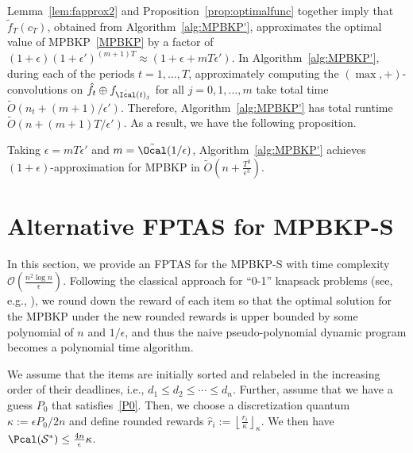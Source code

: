 Lemma~\ref{lem:fapprox2} and Proposition~\ref{prop:optimalfunc} together imply that $\tilde{f}_T(c_T)$, obtained from Algorithm~\ref{alg:MPBKP'}, approximates the optimal value of MPBKP~\eqref{MPBKP} by a factor of $(1+\epsilon)(1+\epsilon')^{(m+1)T} \approx (1+\epsilon+mT\epsilon')$. In Algorithm~\ref{alg:MPBKP'}, during each of the periods $t=1,\ldots,T$, approximately computing the $(\max,+)$-convolutions on $\hat{f}_{t}\oplus {f}_{\hat{\Ical}(t)_j}$ for all $j=0,1,\ldots,m$ take total time $\tilde{O}\left(n_t+ (m+1)/\epsilon'\right)$. Therefore, Algorithm~\ref{alg:MPBKP'} has total runtime $\tilde{O}\left(n+(m+1)T/\epsilon'\right)$. As a result, we have the following proposition. 
\begin{proposition}%
	Taking $\epsilon = mT\epsilon'$ and $m=\tilde{\Ocal}(1/\epsilon)$, Algorithm~\ref{alg:MPBKP'} achieves $(1+\epsilon)$-approximation for MPBKP in $\tilde{O}\left(n+\frac{T^2}{{\epsilon}^3}\right)$.
\end{proposition}

\section{Alternative FPTAS for MPBKP-S}\label{simple-MPBKP-S}

In this section, we provide an FPTAS for the MPBKP-S with time complexity $\mathcal{O}\left(\frac{n^2\log n}{\epsilon}\right)$. Following the classical approach for ``0-1'' knapsack problems (see, e.g., \cite{vazirani2013approximation}), we round down the reward of each item so that the optimal solution for the MPBKP under the new rounded rewards is upper bounded by some polynomial of $n$ and $1/\epsilon$, and thus the naive pseudo-polynomial dynamic program becomes a polynomial time algorithm. 




We assume that the items are initially sorted and relabeled in the increasing order of their deadlines, i.e., $d_1\le d_2\le \cdots\le d_n$. Further, assume that we have a guess $P_0$ that satisfies~\eqref{P0}. Then, we choose a discretization quantum $\kappa:=\epsilon P_0/2n$ and define rounded rewards $\hat{r}_i:=\left\lfloor\frac{r_i}{\kappa}\right\rfloor_{\kappa}$. We then have $\Pcal(\mathcal{S}^*)\le \frac{4n}{\epsilon}\kappa$.

